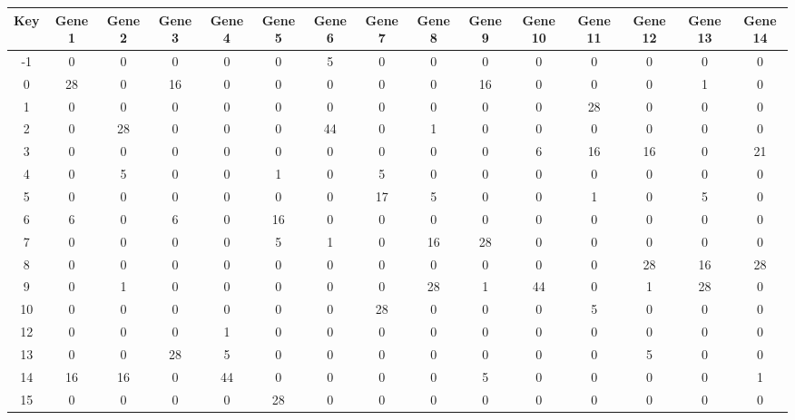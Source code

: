 \begin{tabular}{|c|c|c|c|c|c|c|c|c|c|c|c|c|c|c|}
\hline
Key & Gene 1 & Gene 2 & Gene 3 & Gene 4 & Gene 5 & Gene 6 & Gene 7 & Gene 8 & Gene 9 & Gene 10 & Gene 11 & Gene 12 & Gene 13 & Gene 14 \\
\hline
-1 & 0 & 0 & 0 & 0 & 0 & 5 & 0 & 0 & 0 & 0 & 0 & 0 & 0 & 0 \\
0 & 28 & 0 & 16 & 0 & 0 & 0 & 0 & 0 & 16 & 0 & 0 & 0 & 1 & 0 \\
1 & 0 & 0 & 0 & 0 & 0 & 0 & 0 & 0 & 0 & 0 & 28 & 0 & 0 & 0 \\
2 & 0 & 28 & 0 & 0 & 0 & 44 & 0 & 1 & 0 & 0 & 0 & 0 & 0 & 0 \\
3 & 0 & 0 & 0 & 0 & 0 & 0 & 0 & 0 & 0 & 6 & 16 & 16 & 0 & 21 \\
4 & 0 & 5 & 0 & 0 & 1 & 0 & 5 & 0 & 0 & 0 & 0 & 0 & 0 & 0 \\
5 & 0 & 0 & 0 & 0 & 0 & 0 & 17 & 5 & 0 & 0 & 1 & 0 & 5 & 0 \\
6 & 6 & 0 & 6 & 0 & 16 & 0 & 0 & 0 & 0 & 0 & 0 & 0 & 0 & 0 \\
7 & 0 & 0 & 0 & 0 & 5 & 1 & 0 & 16 & 28 & 0 & 0 & 0 & 0 & 0 \\
8 & 0 & 0 & 0 & 0 & 0 & 0 & 0 & 0 & 0 & 0 & 0 & 28 & 16 & 28 \\
9 & 0 & 1 & 0 & 0 & 0 & 0 & 0 & 28 & 1 & 44 & 0 & 1 & 28 & 0 \\
10 & 0 & 0 & 0 & 0 & 0 & 0 & 28 & 0 & 0 & 0 & 5 & 0 & 0 & 0 \\
12 & 0 & 0 & 0 & 1 & 0 & 0 & 0 & 0 & 0 & 0 & 0 & 0 & 0 & 0 \\
13 & 0 & 0 & 28 & 5 & 0 & 0 & 0 & 0 & 0 & 0 & 0 & 5 & 0 & 0 \\
14 & 16 & 16 & 0 & 44 & 0 & 0 & 0 & 0 & 5 & 0 & 0 & 0 & 0 & 1 \\
15 & 0 & 0 & 0 & 0 & 28 & 0 & 0 & 0 & 0 & 0 & 0 & 0 & 0 & 0 \\
\hline
\end{tabular}